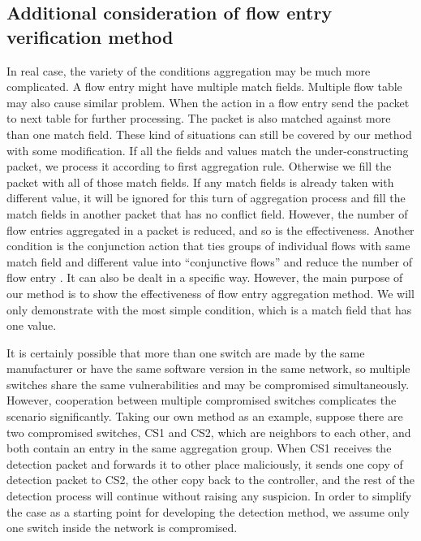 \subsection{Additional consideration of flow entry verification method}
\label{Further_discussion}

In real case, the variety of the conditions aggregation may be much more complicated. A flow entry might have multiple match fields. Multiple flow table may also cause similar problem. When the action in a flow entry send the packet to next table for further processing. The packet is also matched against more than one match field. These kind of situations can still be covered by our method with some modification. 
If all the fields and values match the under-constructing packet, we process it according to first aggregation rule. Otherwise we fill the packet with all of those match fields. If any match fields is already taken with different value, it will be ignored for this turn of aggregation process and fill the match fields in another packet that has no conflict field. However, the number of flow entries aggregated in a packet is reduced, and so is the effectiveness. Another condition is the conjunction action that ties groups of individual flows with same match field and different value into ``conjunctive flows'' and reduce the number of flow entry \cite{OVS_OFCTL}. It can also be dealt in a specific way. However, the main purpose of our method is to show the effectiveness of flow entry aggregation method. We will only demonstrate with the most simple condition, which is a match field that has one value.

It is certainly possible that more than one switch are made by the same manufacturer or have the same software version in the same network, so multiple switches share the same vulnerabilities and may be compromised simultaneously. However, cooperation between multiple compromised switches complicates the scenario significantly. Taking our own method as an example, suppose there are two compromised switches, CS1 and CS2, which are neighbors to each other, and both contain an entry in the same aggregation group. When CS1 receives the detection packet and forwards it to other place maliciously, it sends one copy of detection packet to CS2, the other copy back to the controller, and the rest of the detection process will continue without raising any suspicion\sout{}. In order to simplify the case as a starting point for developing the detection method, we assume only one switch inside the network is compromised.

